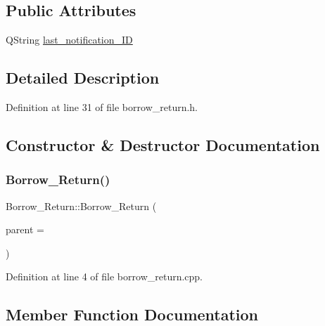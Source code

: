 \subsection*{Public Attributes}
\begin{DoxyCompactItemize}
\item 
Q\+String \mbox{\hyperlink{class_borrow___return_ab0439e8a8c1c061b43bc4e57d8a4a491}{last\+\_\+notification\+\_\+\+ID}}
\end{DoxyCompactItemize}


\subsection{Detailed Description}


Definition at line 31 of file borrow\+\_\+return.\+h.



\subsection{Constructor \& Destructor Documentation}
\mbox{\label{class_borrow___return_a60ee7fbb6b774305fbd655bd362572c5}} 
\subsubsection{\texorpdfstring{Borrow\_Return()}{Borrow\_Return()}}
{\footnotesize\ttfamily Borrow\+\_\+\+Return\+::\+Borrow\+\_\+\+Return (\begin{DoxyParamCaption}\item[{Q\+Widget $\ast$}]{parent = {} }\end{DoxyParamCaption})\hspace{0.3cm}{\ttfamily [explicit]}}



Definition at line 4 of file borrow\+\_\+return.\+cpp.



\subsection{Member Function Documentation}
\mbox{\label{class_borrow___return_a1a2d49b2df8463373e60506f77005e64}} 
